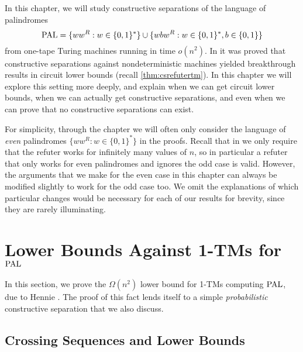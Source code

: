 
In this chapter, we will study constructive separations of the language of palindromes
$$\mathrm{PAL} = \{ww^R : w \in \{0, 1\}^*\} \cup \{wbw^R : w \in \{0, 1\}^*, b \in \{0, 1\}\}$$
from one-tape Turing machines running in time $o(n^2)$. In \cite{ConstructiveSeparations}
it was proved that constructive separations against nondeterministic machines yielded
breakthrough results in circuit lower bounds (recall \cref{thm:csrefutertm}). In this chapter
we will explore this setting more deeply, and explain when we can get circuit lower bounds, 
when we can actually get constructive separations, and even when we can prove that no 
constructive separations can exist. 

For simplicity, through the chapter we will often only consider the language 
of \emph{even} palindromes $\{ww^R : w \in \{0, 1\}^*\}$ in the proofs. 
Recall that in  we only require
that the refuter works
for infinitely many values of $n$, so in particular a refuter that only works for
even palindromes and ignores the odd case is valid. However, the arguments that
we make for the even case in this chapter can always be modified slightly to 
work for the odd case too. We omit the explanations of which particular changes 
would be necessary for each of our results for brevity, since they are rarely
illuminating. 



\section{Lower Bounds Against 1-TMs for $\mathrm{PAL}$}

In this section, we prove the $\Omega(n^2)$ lower bound for 1-TMs computing $\mathrm{PAL}$,
due to Hennie \cite{Hennie65}. The proof of this fact lends itself to a simple
\emph{probabilistic} constructive separation that we also discuss. 

\subsection{Crossing Sequences and Lower Bounds}


